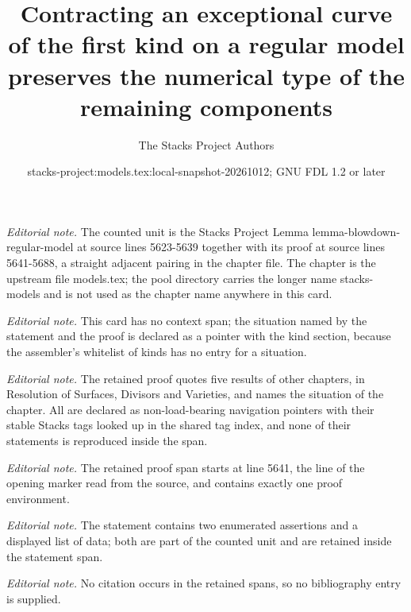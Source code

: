 \documentclass[10pt,a4paper]{amsart}
\title{Contracting an exceptional curve of the first kind on a regular model preserves the numerical type of the remaining components}
\author{The Stacks Project Authors}
\date{stacks-project:models.tex:local-snapshot-20261012; GNU FDL 1.2 or later}
\theoremstyle{plain}
\theoremstyle{definition}
\theoremstyle{remark}
\numberwithin{equation}{subsection}
\begin{document}
\maketitle
\noindent\textit{Editorial note.} The counted unit is the Stacks Project Lemma lemma-blowdown-regular-model at source lines 5623-5639 together with its proof at source lines 5641-5688, a straight adjacent pairing in the chapter file. The chapter is the upstream file models.tex; the pool directory carries the longer name stacks-models and is not used as the chapter name anywhere in this card.\par\medskip
\noindent\textit{Editorial note.} This card has no context span; the situation named by the statement and the proof is declared as a pointer with the kind section, because the assembler's whitelist of kinds has no entry for a situation.\par\medskip
\noindent\textit{Editorial note.} The retained proof quotes five results of other chapters, in Resolution of Surfaces, Divisors and Varieties, and names the situation of the chapter. All are declared as non-load-bearing navigation pointers with their stable Stacks tags looked up in the shared tag index, and none of their statements is reproduced inside the span.\par\medskip
\noindent\textit{Editorial note.} The retained proof span starts at line 5641, the line of the opening marker read from the source, and contains exactly one proof environment.\par\medskip
\noindent\textit{Editorial note.} The statement contains two enumerated assertions and a displayed list of data; both are part of the counted unit and are retained inside the statement span.\par\medskip
\noindent\textit{Editorial note.} No citation occurs in the retained spans, so no bibliography entry is supplied.\par\medskip
\end{document}
